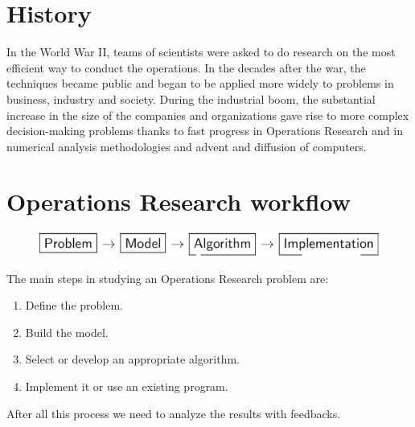 \documentclass[12pt, a4paper]{report}
\begin{document}
    \section{History}
    In the World War II, teams of scientists were asked to do research on the most efficient way to conduct the operations.
    In the decades after the war, the techniques became public and began to be applied more widely to problems in business, industry and society.
    During the industrial boom, the substantial increase in the size of the companies and organizations gave rise to more complex decision-making problems thanks to
    fast progress in Operations Research and in numerical analysis methodologies and advent and diffusion of computers. 

    \section{Operations Research workflow}
    \begin{figure}[H]
        \centering
        \includegraphics[width=1\linewidth]{images/study.png}
    \end{figure}
    The main steps in studying an Operations Research problem are: 
    \begin{enumerate}
        \item Define the problem.
        \item Build the model.
        \item Select or develop an appropriate algorithm. 
        \item Implement it or use an existing program. 
    \end{enumerate}
    After all this process we need to analyze the results with feedbacks. 
\end{document}
